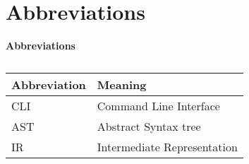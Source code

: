 \section{Abbreviations}

\textbf{Abbreviations}\\
\begin{table}[H]
  \caption{}
  \label{tab:}
  \begin{tabular}{|p{5cm}|p{5cm}|}
    \hline
    Abbreviation & Meaning\\
    \hline
    CLI & Command Line Interface\\
    \hline
    AST & Abstract Syntax tree\\
    \hline
    IR & Intermediate Representation\\
    \hline
  \end{tabular}
\end{table}
